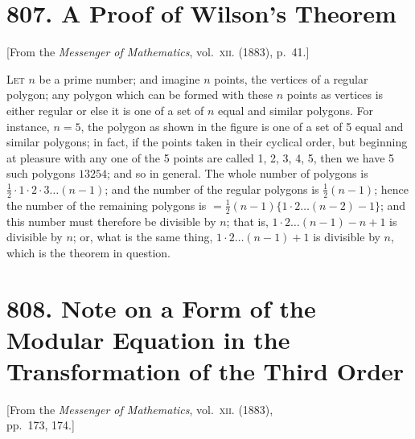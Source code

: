 \documentclass[11pt,a4paper]{article}
\theoremstyle{plain}
\theoremstyle{definition}
\theoremstyle{remark}
\begin{document}
\newpage
\section*{807. A Proof of Wilson's Theorem}

\begin{center}
\small[From the \textit{Messenger of Mathematics}, vol.~\textsc{xii}. (1883), p.~41.]
\end{center}

\bigskip

\noindent
\textsc{Let} $n$ be a prime number; and imagine $n$ points, the vertices of a regular polygon; any polygon which can be formed with these $n$ points as vertices is either regular or else it is one of a set of $n$ equal and similar polygons. For instance, $n=5$, the polygon as shown in the figure is one of a set of 5 equal and similar polygons; in fact, if the points taken in their cyclical order, but beginning at pleasure with any one of the 5 points are called 1, 2, 3, 4, 5, then we have 5 such polygons $13254$; and so in general. The whole number of polygons is $\frac{1}{2}\cdot 1\cdot 2\cdot 3\ldots(n-1)$; and the number of the regular polygons is $\frac{1}{2}(n-1)$; hence the number of the remaining polygons is $= \frac{1}{2}(n-1)\{1\cdot 2\ldots(n-2) - 1\}$; and this number must therefore be divisible by $n$; that is, $1\cdot 2\ldots(n-1) - n + 1$ is divisible by $n$; or, what is the same thing, $1\cdot 2\ldots(n-1) + 1$ is divisible by $n$, which is the theorem in question.


\newpage
\section*{808. Note on a Form of the Modular Equation in the Transformation of the Third Order}

\begin{center}
\small[From the \textit{Messenger of Mathematics}, vol.~\textsc{xii}. (1883),\\
pp.~173, 174.]
\end{center}
\end{document}
